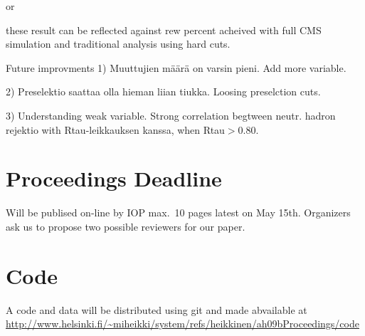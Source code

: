 \begin{appendix}
or 

these result  can be reflected against rew percent acheived with full CMS simulation
and traditional analysis using hard cuts.

Future improvments
1) Muuttujien määrä on varsin pieni. Add more variable.

2) Preselektio saattaa olla hieman liian tiukka. Loosing preselction cuts.

3) Understanding weak variable. 
  Strong correlation begtween neutr. hadron rejektio with Rtau-leikkauksen kanssa, when Rtau$>$0.80. 

\section{Proceedings Deadline }
Will be publised on-line by IOP max.~10 pages latest on May 15th. 
Organizers ask us to propose two possible reviewers for our paper.


\section{Code}
A code and data will be distributed using git and made abvailable 
at \\ \url{http://www.helsinki.fi/~miheikki/system/refs/heikkinen/ah09bProceedings/code}




\end{appendix}
